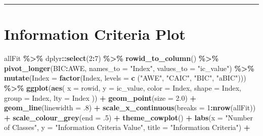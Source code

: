 \documentclass[
]{book}
\newenvironment{Shaded}{\begin{snugshade}}{\end{snugshade}}
\newcommand{\AttributeTok}[1]{\textcolor[rgb]{0.13,0.29,0.53}{#1}}
\newcommand{\DecValTok}[1]{\textcolor[rgb]{0.00,0.00,0.81}{#1}}
\newcommand{\FloatTok}[1]{\textcolor[rgb]{0.00,0.00,0.81}{#1}}
\newcommand{\FunctionTok}[1]{\textcolor[rgb]{0.13,0.29,0.53}{\textbf{#1}}}
\newcommand{\NormalTok}[1]{#1}
\newcommand{\SpecialCharTok}[1]{\textcolor[rgb]{0.81,0.36,0.00}{\textbf{#1}}}
\newcommand{\StringTok}[1]{\textcolor[rgb]{0.31,0.60,0.02}{#1}}
\begin{document}
\begin{center}\rule{0.5\linewidth}{0.5pt}\end{center}

\section{Information Criteria Plot}\label{information-criteria-plot}

\begin{Shaded}
\begin{Highlighting}[]
\NormalTok{allFit }\SpecialCharTok{\%\textgreater{}\%}
\NormalTok{  dplyr}\SpecialCharTok{::}\FunctionTok{select}\NormalTok{(}\DecValTok{2}\SpecialCharTok{:}\DecValTok{7}\NormalTok{) }\SpecialCharTok{\%\textgreater{}\%}
  \FunctionTok{rowid\_to\_column}\NormalTok{() }\SpecialCharTok{\%\textgreater{}\%}
  \FunctionTok{pivot\_longer}\NormalTok{(}\StringTok{\textasciigrave{}}\AttributeTok{BIC}\StringTok{\textasciigrave{}}\SpecialCharTok{:}\StringTok{\textasciigrave{}}\AttributeTok{AWE}\StringTok{\textasciigrave{}}\NormalTok{,}
               \AttributeTok{names\_to =} \StringTok{"Index"}\NormalTok{,}
               \AttributeTok{values\_to =} \StringTok{"ic\_value"}\NormalTok{) }\SpecialCharTok{\%\textgreater{}\%}
  \FunctionTok{mutate}\NormalTok{(}\AttributeTok{Index =} \FunctionTok{factor}\NormalTok{(Index,}
                        \AttributeTok{levels =} \FunctionTok{c}\NormalTok{ (}\StringTok{"AWE"}\NormalTok{, }\StringTok{"CAIC"}\NormalTok{, }\StringTok{"BIC"}\NormalTok{, }\StringTok{"aBIC"}\NormalTok{))) }\SpecialCharTok{\%\textgreater{}\%}
  \FunctionTok{ggplot}\NormalTok{(}\FunctionTok{aes}\NormalTok{(}
    \AttributeTok{x =}\NormalTok{ rowid,}
    \AttributeTok{y =}\NormalTok{ ic\_value,}
    \AttributeTok{color =}\NormalTok{ Index,}
    \AttributeTok{shape =}\NormalTok{ Index,}
    \AttributeTok{group =}\NormalTok{ Index,}
    \AttributeTok{lty =}\NormalTok{ Index}
\NormalTok{  )) }\SpecialCharTok{+}
  \FunctionTok{geom\_point}\NormalTok{(}\AttributeTok{size =} \FloatTok{2.0}\NormalTok{) }\SpecialCharTok{+} \FunctionTok{geom\_line}\NormalTok{(}\AttributeTok{linewidth =}\NormalTok{ .}\DecValTok{8}\NormalTok{) }\SpecialCharTok{+}
  \FunctionTok{scale\_x\_continuous}\NormalTok{(}\AttributeTok{breaks =} \DecValTok{1}\SpecialCharTok{:}\FunctionTok{nrow}\NormalTok{(allFit)) }\SpecialCharTok{+}
  \FunctionTok{scale\_colour\_grey}\NormalTok{(}\AttributeTok{end =}\NormalTok{ .}\DecValTok{5}\NormalTok{) }\SpecialCharTok{+}
  \FunctionTok{theme\_cowplot}\NormalTok{() }\SpecialCharTok{+}
  \FunctionTok{labs}\NormalTok{(}\AttributeTok{x =} \StringTok{"Number of Classes"}\NormalTok{, }\AttributeTok{y =} \StringTok{"Information Criteria Value"}\NormalTok{, }\AttributeTok{title =} \StringTok{"Information Criteria"}\NormalTok{) }\SpecialCharTok{+}

\end{Highlighting}
\end{Shaded}
\end{document}

